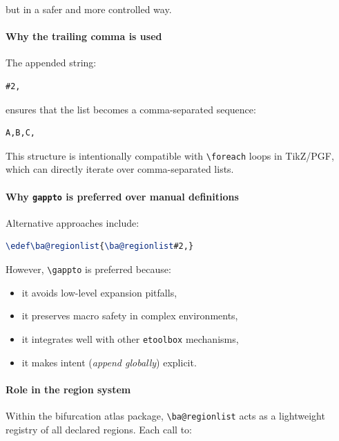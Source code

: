 but in a safer and more controlled way.



\paragraph{Why the trailing comma is used}

The appended string:

\begin{lstlisting}[language=LaTeX]
#2,
\end{lstlisting}

ensures that the list becomes a comma-separated sequence:

\begin{lstlisting}[language=LaTeX]
A,B,C,
\end{lstlisting}

This structure is intentionally compatible with \verb|\foreach| loops in TikZ/PGF, which can directly iterate over comma-separated lists.



\paragraph{Why \texttt{gappto} is preferred over manual definitions}

Alternative approaches include:

\begin{lstlisting}[language=LaTeX]
\edef\ba@regionlist{\ba@regionlist#2,}
\end{lstlisting}

However, \verb|\gappto| is preferred because:

\begin{itemize}
\item it avoids low-level expansion pitfalls,
\item it preserves macro safety in complex environments,
\item it integrates well with other \texttt{etoolbox} mechanisms,
\item it makes intent (\emph{append globally}) explicit.
\end{itemize}



\paragraph{Role in the region system}

Within the bifurcation atlas package, \verb|\ba@regionlist| acts as a lightweight registry of all declared regions. Each call to:

